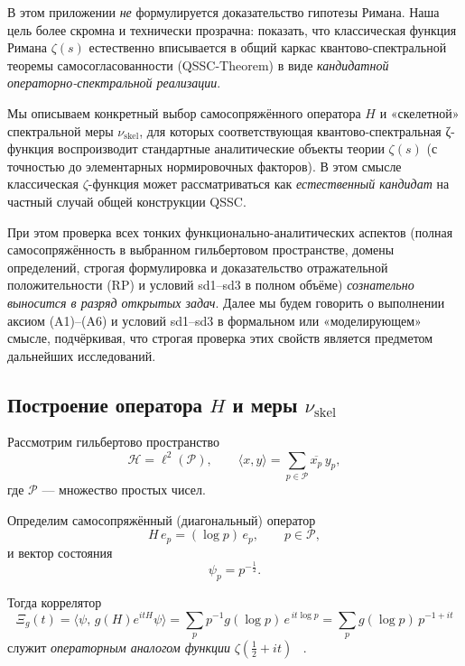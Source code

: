 \documentclass{article}
\numberwithin{equation}{section}
\theoremstyle{plain}
\theoremstyle{definition}
\theoremstyle{remark}
\begin{document}
\noindent
В этом приложении \emph{не} формулируется доказательство гипотезы Римана.
Наша цель более скромна и технически прозрачна: показать, что классическая
функция Римана $\zeta(s)$ естественно вписывается в общий каркас
квантово-спектральной теоремы самосогласованности (QSSC-Theorem) в виде
\emph{кандидатной операторно-спектральной реализации}.

Мы описываем конкретный выбор самосопряжённого оператора $H$ и
«скелетной» спектральной меры $\nu_{\mathrm{skel}}$, для которых
соответствующая квантово-спектральная ζ-функция воспроизводит стандартные
аналитические объекты теории $\zeta(s)$ (с точностью до элементарных
нормировочных факторов). В этом смысле классическая $\zeta$-функция
может рассматриваться как \emph{естественный кандидат} на частный случай
общей конструкции QSSC.

При этом проверка всех тонких функционально-аналитических аспектов
(полная самосопряжённость в выбранном гильбертовом пространстве,
домены определений, строгая формулировка и доказательство
отражательной положительности (RP) и условий sd1–sd3 в полном объёме)
\emph{сознательно выносится в разряд открытых задач}. Далее мы будем
говорить о выполнении аксиом (A1)–(A6) и условий sd1–sd3 в формальном
или «моделирующем» смысле, подчёркивая, что строгая проверка этих
свойств является предметом дальнейших исследований.

\subsection*{Построение оператора $H$ и меры $\nu_{\mathrm{skel}}$}

Рассмотрим гильбертово пространство
\begin{equation}
\mathcal H = \ell^2(\mathcal P), \qquad
\langle x,y\rangle = \sum_{p\in\mathcal P}\overline{x_p}\,y_p,
\end{equation}
где $\mathcal P$ — множество простых чисел.

Определим самосопряжённый (диагональный) оператор
\begin{equation}
H\,e_p = (\log p)\,e_p, \qquad p\in\mathcal P,
\end{equation}
и вектор состояния
\begin{equation}
\psi_p = p^{-\frac{1}{2}}.
\end{equation}

Тогда коррелятор
\begin{equation}
\Xi_g(t) = \langle \psi,\,g(H)e^{itH}\psi\rangle
          = \sum_{p} p^{-1} g(\log p)\,e^{\,it\log p}
          = \sum_{p} g(\log p)\,p^{-1+it}
\end{equation}
служит \emph{операторным аналогом функции} $\zeta(\tfrac{1}{2}+it)$ ~\cite{Cramer1935}.
\end{document}
